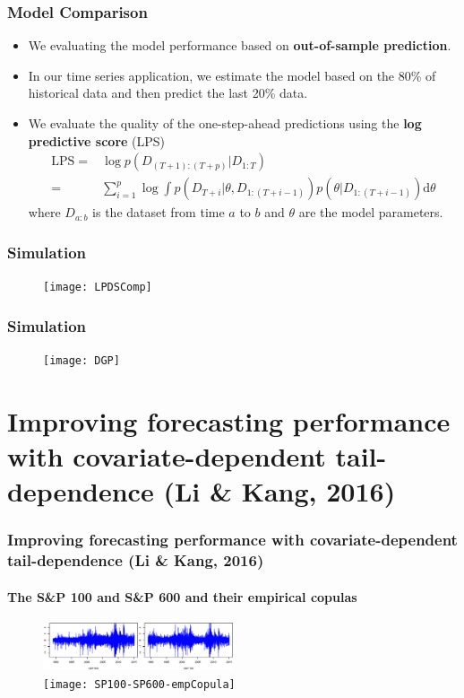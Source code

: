 \documentclass[10pt,aspectratio=169]{beamer}
\begin{document}
\begin{frame}
  \frametitle{Model Comparison}
  \begin{itemize}
  \item We evaluating the model performance based on \textbf{out-of-sample prediction}.
  \item In our time series application, we estimate the model based on the 80\% of
    historical data and then predict the last 20\% data.

  \item We evaluate the quality of the one-step-ahead predictions using the \textbf{log
      predictive score} (LPS)
    \begin{align*}
      \mathrm{LPS}=&\log p(D_{(T+1):(T+p)}|D_{1:T})\\
      =&\sum\nolimits _{i=1}^{p}\log\int p(D_{T+i}|\theta,D_{1:(T+i-1)})p(\theta|D_{1:(T+i-1)})\mathrm{d}\theta
    \end{align*}
    where $D_{a:b}$ is the dataset from time $a$ to $b$ and $\theta$ are the model
    parameters.
  \end{itemize}
\end{frame}


\begin{frame}
  \frametitle{Simulation}

  \begin{figure}[!h]
    \centering
    \texttt{[image: LPDSComp]}
  \end{figure}
\end{frame}

\begin{frame}
  \frametitle{Simulation}

  \begin{figure}[!h]
    \centering
    \texttt{[image: DGP]}
  \end{figure}
\end{frame}

\section{Improving forecasting performance with covariate-dependent tail-dependence (Li \&
  Kang, 2016)}



\begin{frame}
  \frametitle{Improving forecasting performance with covariate-dependent tail-dependence (Li \&
  Kang, 2016)}
  \framesubtitle{The S\&P 100 and S\&P 600 and their empirical copulas}
 \begin{figure}[!h]
    \centering
    \includegraphics[width=0.5\textwidth]{SP100-SP600}\\
    \texttt{[image: SP100-SP600-empCopula]}
  \end{figure}
\end{frame}
\end{document}
